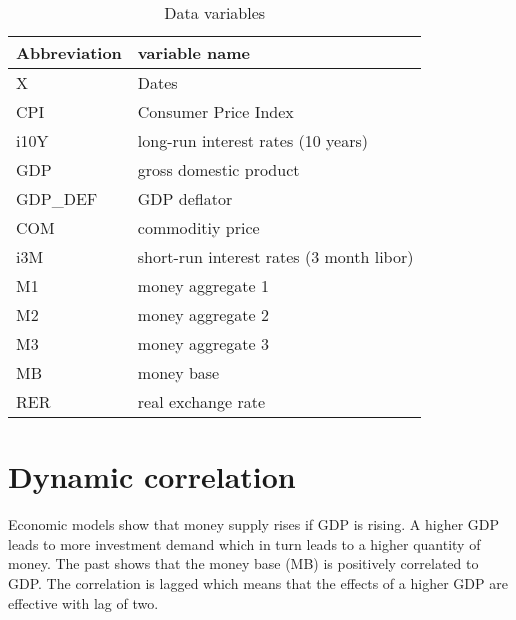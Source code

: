 \documentclass[11pt,a4paper]{report}
\begin{document}


\begin{table}
\centering
\caption{Data variables}
\label{tab: var}
\begin{tabular}{l|l}
	\textbf{Abbreviation} & \textbf{variable name}\\\hline\hline
	X & Dates\\
	CPI & Consumer Price Index \\
	i10Y & long-run interest rates (10 years) \\
	GDP & gross domestic product\\
	GDP_DEF & GDP deflator \\
	COM & commoditiy price \\
	i3M & short-run interest rates (3 month libor) \\
	M1 & money aggregate 1 \\
	M2 & money aggregate 2 \\
	M3 & money aggregate 3 \\
	MB & money base \\
	RER & real exchange rate \\
\hline
\end{tabular}
\end{table}
 

\newpage
\section*{Dynamic correlation}

Economic models show that money supply rises if GDP is rising. A higher GDP leads to more investment demand which in turn leads to a higher quantity of money.  
The past shows that the money base (MB) is positively correlated to GDP. The correlation is lagged which means that the effects of a higher GDP are effective with lag of two. 
\end{document}
